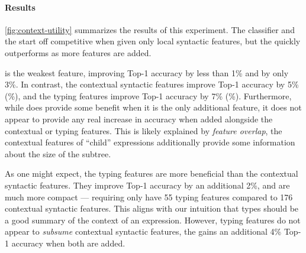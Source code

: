 %
\paragraph{Results}
\autoref{fig:context-utility} summarizes the results of this experiment.
%
The \linear classifier and the \hiddenFH start off
competitive when given only local syntactic features, but the \hiddenFH
quickly outperforms as more features are added.

\ExprSize is the weakest feature, improving \linear Top-1
accuracy by less than 1\% and \hiddenFH by only 3\%.
%
In contrast, the contextual syntactic features improve \linear Top-1
accuracy by 5\% (\%), and the typing features improve
Top-1 accuracy by 7\% (\%).
%
Furthermore, while \ExprSize does provide some benefit when it is the
only additional feature, it does not appear to provide any real increase
in accuracy when added alongside the contextual or typing features.
%
This is likely explained by \emph{feature overlap}, \ie the contextual
features of ``child'' expressions additionally provide some information
about the size of the subtree.

As one might expect, the typing features are more beneficial than the
contextual syntactic features.
%
They improve Top-1 accuracy by an additional 2\%, and are much more
compact --- requiring only have 55 typing features compared to 176
contextual syntactic features.
%
This aligns with our intuition that types should be a good summary of
the context of an expression.
%
However, typing features do not appear to \emph{subsume} contextual
syntactic features, the \hiddenFH gains an additional 4\% Top-1 accuracy
when both are added.
